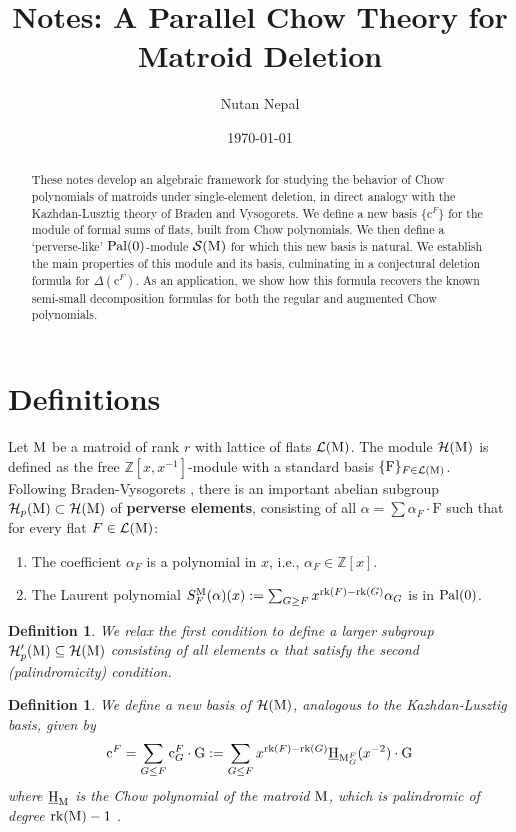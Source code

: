 \documentclass[11pt]{article}
\title{\texorpdfstring{Notes: A Parallel Chow Theory for Matroid Deletion}{Notes: A Parallel Chow Theory for Matroid Deletion}}
\author{Nutan Nepal}
\date{\today}
\newcommand{\calH}{\mathcal{H}}
\newcommand{\calS}{\mathcal{S}}
\newcommand{\chow}{\normalfont\text{\underline{H}}}
\newcommand{\rank}{\normalfont\text{rk}}
\newcommand{\M}{\normalfont\text{M}}
\newcommand{\ZZ}{\mathbb{Z}}
\newcommand{\Ebasis}[1]{\mathrm{#1}}
\newcommand{\Cbasis}[1]{\mathrm{c}^{#1}}
\newcommand{\CbasisSub}[2]{\mathrm{c}^{#1}_{#2}}
\newcommand{\pal}{\normalfont\text{Pal}}
\newtheorem{definition}[theorem]{Definition}
\theoremstyle{remark}
\begin{document}
\maketitle

\begin{abstract}
    These notes develop an algebraic framework for studying the behavior of Chow polynomials of matroids under single-element deletion, in direct analogy with the Kazhdan-Lusztig theory of Braden and Vysogorets. We define a new basis \(\{\Cbasis{F}\}\) for the module of formal sums of flats, built from Chow polynomials. We then define a `perverse-like' \(\pal(0)\)-module \(\calS(\M)\) for which this new basis is natural. We establish the main properties of this module and its basis, culminating in a conjectural deletion formula for \(\Delta(\Cbasis{F})\). As an application, we show how this formula recovers the known semi-small decomposition formulas for both the regular and augmented Chow polynomials.
\end{abstract}

\section{Definitions}

Let \(\M\) be a matroid of rank \(r\) with lattice of flats \(\mathcal{L}(\M)\). The module \(\calH(\M)\) is defined as the free \(\ZZ[x, x^{-1}]\)-module with a standard basis \(\{\Ebasis{F}\}_{F \in \mathcal{L}(\M)}\).
Following Braden-Vysogorets \cite{BV20}, there is an important abelian subgroup \(\calH_p(\M) \subset \calH(\M)\) of \textbf{perverse elements}, consisting of all \(\alpha = \sum \alpha_F \cdot \Ebasis{F}\) such that for every flat \(F \in \mathcal{L}(\M)\):
\begin{enumerate}
    \item The coefficient \(\alpha_F\) is a polynomial in \(x\), i.e., \(\alpha_F \in \ZZ[x]\).
    \item The Laurent polynomial \(S_F^{\M}(\alpha)(x):=\sum_{G \ge F} x^{\rank(F)-\rank(G)} \alpha_G\) is in \(\pal(0)\).
\end{enumerate}

\begin{definition}
    We relax the first condition to define a larger subgroup \(\calH'_p(\M) \subseteq \calH(\M)\) consisting of all elements \(\alpha\) that satisfy the second (palindromicity) condition.
\end{definition}

\begin{definition}
    We define a new basis of \(\calH(\M)\), analogous to the Kazhdan-Lusztig basis, given by
    \[
        \Cbasis{F} = \sum_{G\le F} \CbasisSub{F}{G}\cdot\Ebasis{G} :=
        \sum_{G \le F} x^{\rank(F)-\rank(G)} \chow_{\M_G^F}(x^{-2}) \cdot \Ebasis{G}
    \]
    where \(\chow_{\M}\) is the Chow polynomial of the matroid \(\M\), which is palindromic of degree \(\rank(\M)-1\) \cite{FMSV24}.
\end{definition}
\end{document}

